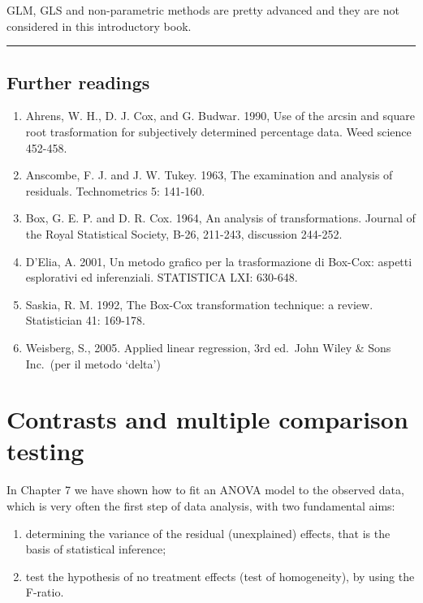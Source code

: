 \documentclass[a4paper,12pt,oneside]{book}
\providecommand{\tightlist}{%
  \setlength{\itemsep}{0pt}\setlength{\parskip}{0pt}}
\begin{document}
GLM, GLS and non-parametric methods are pretty advanced and they are not considered in this introductory book.

\begin{center}\rule{0.5\linewidth}{0.5pt}\end{center}

\hypertarget{further-readings-6}{%
\section{Further readings}\label{further-readings-6}}

\begin{enumerate}
\def\labelenumi{\arabic{enumi}.}
\tightlist
\item
  Ahrens, W. H., D. J. Cox, and G. Budwar. 1990, Use of the arcsin and square root trasformation for subjectively determined percentage data. Weed science 452-458.
\item
  Anscombe, F. J. and J. W. Tukey. 1963, The examination and analysis of residuals. Technometrics 5: 141-160.
\item
  Box, G. E. P. and D. R. Cox. 1964, An analysis of transformations. Journal of the Royal Statistical Society, B-26, 211-243, discussion 244-252.
\item
  D'Elia, A. 2001, Un metodo grafico per la trasformazione di Box-Cox: aspetti esplorativi ed inferenziali. STATISTICA LXI: 630-648.
\item
  Saskia, R. M. 1992, The Box-Cox transformation technique: a review. Statistician 41: 169-178.
\item
  Weisberg, S., 2005. Applied linear regression, 3rd ed.~John Wiley \& Sons Inc.~(per il metodo `delta')
\end{enumerate}

\hypertarget{contrasts-and-multiple-comparison-testing}{%
\chapter{Contrasts and multiple comparison testing}\label{contrasts-and-multiple-comparison-testing}}

In Chapter 7 we have shown how to fit an ANOVA model to the observed data, which is very often the first step of data analysis, with two fundamental aims:

\begin{enumerate}
\def\labelenumi{\arabic{enumi}.}
\tightlist
\item
  determining the variance of the residual (unexplained) effects, that is the basis of statistical inference;
\item
  test the hypothesis of no treatment effects (test of homogeneity), by using the F-ratio.
\end{enumerate}
\end{document}
